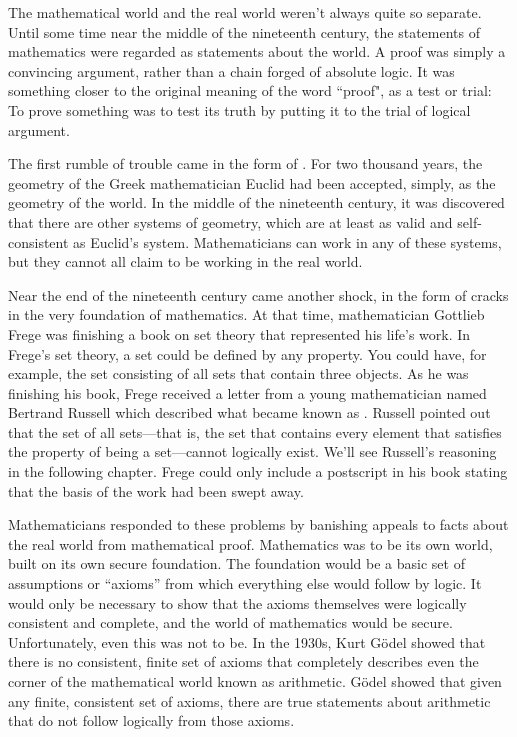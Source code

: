 The mathematical world and the real world weren't always quite so
separate.  Until some time near the middle of the nineteenth
century, the statements of mathematics were regarded as
statements about the world.  A proof was simply a convincing
argument, rather than a chain forged of absolute logic.  
It was something closer to the original meaning of the word ``proof",
as a test or trial:  To prove something was to test its truth by
putting it to the trial of logical argument.

The first rumble of trouble came in the form of .  For two thousand years, the geometry of the Greek mathematician
Euclid had been accepted, simply, as the geometry of the world.
In the middle of the nineteenth century, it was discovered that
there are other systems of geometry, which are at least as valid
and self-consistent as Euclid's system.  Mathematicians can work
in any of these systems, but they cannot all claim to be working 
in the real world.

Near the end of the nineteenth century came another shock, in the form
of cracks in the very foundation of mathematics.  At that time,
mathematician Gottlieb Frege was finishing
a book on set theory that represented his life's work.  In Frege's
set theory, a set could be defined by any property.  You could have,
for example, the set consisting of all sets that contain three objects.
As he was finishing his book, Frege received a letter from a young
mathematician named Bertrand Russell which
described what became known as .  Russell
pointed out that the set of all sets---that is, the set that contains
every element that satisfies the property of being a set---cannot logically
exist.  We'll see Russell's reasoning in the following chapter.  Frege could
only include a postscript in his book stating that the basis of the
work had been swept away.

Mathematicians responded to these problems by banishing appeals to
facts about the real world from mathematical proof.  Mathematics was to
be its own world, built on its own secure foundation.  The foundation
would be a basic set of assumptions or ``axioms'' from which
everything else would follow by logic.  It would only be
necessary to show that the axioms themselves were logically consistent and complete,
and the world of mathematics would be secure.  Unfortunately,
even this was not to be.  In the 1930s, Kurt G\"odel
showed that there is no consistent, finite set of axioms that completely
describes even the corner of the mathematical world known as
arithmetic.  G\"odel showed that given any finite, consistent set of
axioms, there are true statements about arithmetic that do not follow
logically from those axioms.

